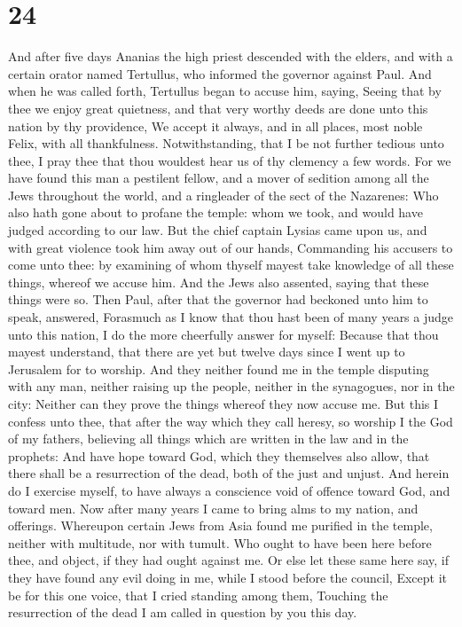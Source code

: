 \hypertarget{section-23}{%
\section{24}\label{section-23}}

 And after five days Ananias the high priest descended with
the elders, and with a certain orator named Tertullus, who informed the
governor against Paul.  And when he was called forth,
Tertullus began to accuse him, saying, Seeing that by thee we enjoy
great quietness, and that very worthy deeds are done unto this nation by
thy providence,  We accept it always, and in all places,
most noble Felix, with all thankfulness.  Notwithstanding,
that I be not further tedious unto thee, I pray thee that thou wouldest
hear us of thy clemency a few words.  For we have found this
man a pestilent fellow, and a mover of sedition among all the Jews
throughout the world, and a ringleader of the sect of the Nazarenes:
 Who also hath gone about to profane the temple: whom we
took, and would have judged according to our law.  But the
chief captain Lysias came upon us, and with great violence took him away
out of our hands,  Commanding his accusers to come unto
thee: by examining of whom thyself mayest take knowledge of all these
things, whereof we accuse him.  And the Jews also assented,
saying that these things were so.  Then Paul, after that
the governor had beckoned unto him to speak, answered, Forasmuch as I
know that thou hast been of many years a judge unto this nation, I do
the more cheerfully answer for myself:  Because that thou
mayest understand, that there are yet but twelve days since I went up to
Jerusalem for to worship.  And they neither found me in the
temple disputing with any man, neither raising up the people, neither in
the synagogues, nor in the city:  Neither can they prove
the things whereof they now accuse me.  But this I confess
unto thee, that after the way which they call heresy, so worship I the
God of my fathers, believing all things which are written in the law and
in the prophets:  And have hope toward God, which they
themselves also allow, that there shall be a resurrection of the dead,
both of the just and unjust.  And herein do I exercise
myself, to have always a conscience void of offence toward God, and
toward men.  Now after many years I came to bring alms to
my nation, and offerings.  Whereupon certain Jews from Asia
found me purified in the temple, neither with multitude, nor with
tumult.  Who ought to have been here before thee, and
object, if they had ought against me.  Or else let these
same here say, if they have found any evil doing in me, while I stood
before the council,  Except it be for this one voice, that
I cried standing among them, Touching the resurrection of the dead I am
called in question by you this day.

